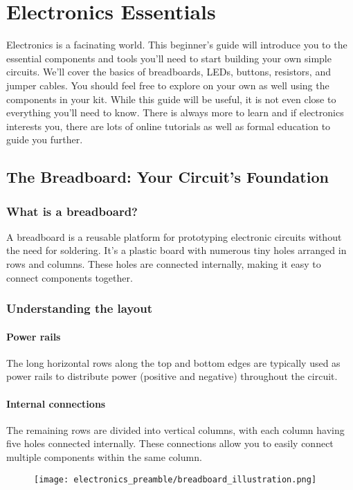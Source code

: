 \chapter{Electronics Essentials}
Electronics is a facinating world. This beginner's guide will introduce you to the essential
components and tools you'll need to start building your own simple circuits. We'll cover the
basics of breadboards, LEDs, buttons, resistors, and jumper cables. You should feel free to
explore on your own as well using the components in your kit. While this guide will be useful,
it is not even close to everything you'll need to know. There is always more to learn and if
electronics interests you, there are lots of online tutorials as well as formal education to
guide you further.

\section{The Breadboard: Your Circuit's Foundation}
\subsection{What is a breadboard?}

A breadboard is a reusable platform for prototyping electronic circuits without the need for
soldering. It's a plastic board with numerous tiny holes arranged in rows and columns. These holes
are connected internally, making it easy to connect components together.

\subsection{Understanding the layout}
\subsubsection{Power rails}
The long horizontal rows along the top and bottom edges are typically used as power rails to
distribute power (positive and negative) throughout the circuit.
\subsubsection{Internal connections}
The remaining rows are divided into vertical columns, with each column having five holes connected
internally. These connections allow you to easily connect multiple components within the same column.

\begin{figure}[H]
\centering
    \texttt{[image: electronics\_preamble/breadboard\_illustration.png]}
\end{figure}

